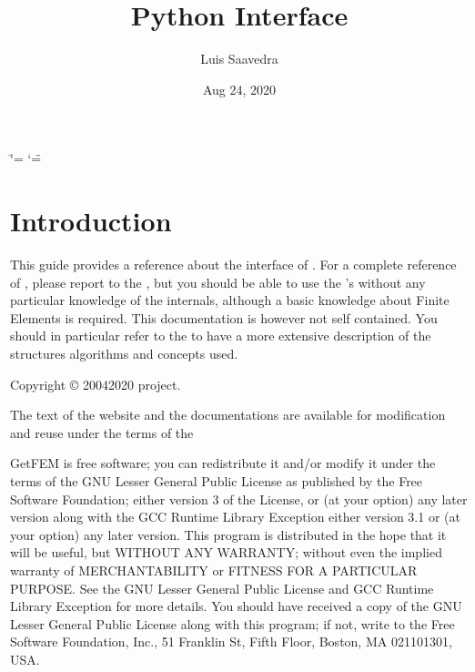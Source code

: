 \documentclass[a4paper,11pt,english]{sphinxmanual}
\title{Python Interface}
\date{Aug 24, 2020}
\author{Luis Saavedra}
\begin{document}
\ifdefined\shorthandoff
  \ifnum\catcode`\=\string=\active\shorthandoff{=}\fi
  \ifnum\catcode`\"=\active{}\fi
\fi

\pagestyle{empty}
\sphinxmaketitle
\pagestyle{plain}
\sphinxtableofcontents
\pagestyle{normal}
\label{\detokenize{python/index::doc}}



\chapter{Introduction}
\label{\detokenize{python/intro:introduction}}\label{\detokenize{python/intro:py-intro}}\label{\detokenize{python/intro::doc}}
This guide provides a reference about the  interface of . For a complete
reference of , please report to the , but you should be able
to use the ’s without any particular knowledge of the  internals,
although a basic knowledge about Finite Elements is required. This documentation
is however not self contained. You should in
particular refer to the  to have a more extensive
description of the structures algorithms and concepts used.

Copyright © 2004\sphinxhyphen{}2020  project.

The text of the  website and the documentations are available for modification and reuse under the terms of the 

GetFEM  is  free software;  you  can  redistribute  it  and/or modify it
under  the  terms  of the  GNU  Lesser General Public License as published
by  the  Free Software Foundation;  either version 3 of the License,  or
(at your option) any later version along with the GCC Runtime Library
Exception either version 3.1 or (at your option) any later version.
This program  is  distributed  in  the  hope  that it will be useful,  but
WITHOUT ANY WARRANTY; without even the implied warranty of MERCHANTABILITY
or  FITNESS  FOR  A PARTICULAR PURPOSE.  See the GNU Lesser General Public
License and GCC Runtime Library Exception for more details.
You  should  have received a copy of the GNU Lesser General Public License
along  with  this program;  if not, write to the Free Software Foundation,
Inc., 51 Franklin St, Fifth Floor, Boston, MA  02110\sphinxhyphen{}1301, USA.
\end{document}
